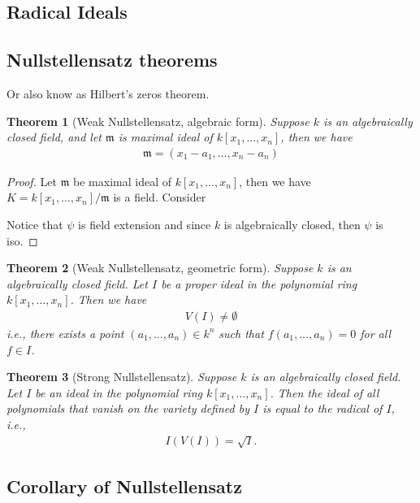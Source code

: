 \documentclass[12pt, a4paper]{article}
\newtheorem{theorem}{Theorem}[section]
\theoremstyle{definition}
\begin{document}
    \subsection{Radical Ideals}
    \subsection{Nullstellensatz theorems}
    Or also know as Hilbert's zeros theorem. 



    \begin{theorem}[Weak Nullstellensatz, algebraic form]
      Suppose $k$ is an algebraically closed field, and let $\mathfrak{m}$ is maximal ideal of $k[x_1, \ldots, x_n]$, then we have
      \begin{align*}
        \mathfrak{m} = (x_1-a_1,\ldots, x_n-a_n)
      \end{align*}
    \end{theorem}

    \begin{proof}
      Let $\mathfrak{m}$ be maximal ideal of $k[x_1, \ldots, x_n]$, then we have $K = k[x_1, \ldots, x_n]/\mathfrak{m}$ is a field. Consider
      \begin{center}
      \end{center}
      Notice that $\psi$ is field extension and since $k$ is algebraically closed, then $\psi$ is iso.   
      
    \end{proof}

    \begin{theorem}[Weak Nullstellensatz, geometric form]
      Suppose $k$ is an algebraically closed field. Let $I$ be a proper ideal in the polynomial ring $k[x_1, \ldots, x_n]$. Then we have 
      \begin{align*}
        V(I) \neq \emptyset
      \end{align*} 
      i.e., there exists a point $(a_1, \ldots, a_n) \in k^n$ such that $f(a_1, \ldots, a_n) = 0$ for all $f \in I$.
    \end{theorem}

    \begin{theorem}[Strong Nullstellensatz]
      Suppose $k$ is an algebraically closed field. Let $I$ be an ideal in the polynomial ring $k[x_1, \ldots, x_n]$. Then the ideal of all polynomials that vanish on the variety defined by $I$ is equal to the radical of $I$, i.e.,
      \begin{align*}
        I(V(I)) = \sqrt{I}.
      \end{align*}
    \end{theorem}

    \subsection{Corollary of Nullstellensatz}
\end{document}
